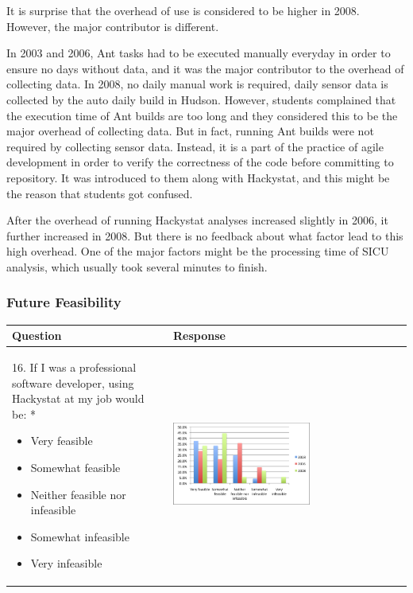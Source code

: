 \documentclass[11pt]{article}
\begin{document}
It is surprise that the overhead of use is considered to be higher in 2008. However, the major contributor is different. 

In 2003 and 2006, Ant tasks had to be executed manually everyday in order to ensure no days without data, and it was the major contributor to the overhead of collecting data. In 2008, no daily manual work is required, daily sensor data is collected by the auto daily build in Hudson. However, students complained that the execution time of Ant builds are too long and they considered this to be the major overhead of collecting data. But in fact, running Ant builds were not required by collecting sensor data. Instead, it is a part of the practice of agile development in order to verify the correctness of the code before committing to repository. It was introduced to them along with Hackystat, and this might be the reason that students got confused. 

After the overhead of running Hackystat analyses increased slightly in 2006, it further increased in 2008. But there is no feedback about what factor lead to this high overhead. One of the major factors might be the processing time of SICU analysis, which usually took several minutes to finish. 


\subsubsection {Future Feasibility}

\begin{center}
\footnotesize
\begin{tabular}{|m{}|m{}|}
\hline 
{\bf Question} & {\bf Response} \\ \hline
16. If I was a professional software developer, using Hackystat at my job would be: *
\begin{itemize}
\item Very feasible
\item Somewhat feasible
\item Neither feasible nor infeasible
\item Somewhat infeasible
\item Very infeasible
\end{itemize}
&
\includegraphics[width=0.6\textwidth]{compare-16} \\ \hline

\end{tabular}
\end{center}
\end{document}
